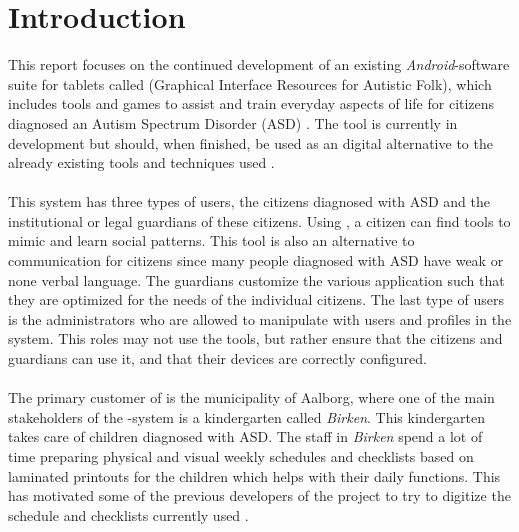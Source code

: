 \chapter{Introduction}
\label{cha:introduction}

This report focuses on the continued development of an existing \emph{Android}-software suite for tablets called \giraf (Graphical Interface Resources for Autistic Folk), which includes tools and games to assist and train everyday aspects of life for citizens diagnosed an Autism Spectrum Disorder (ASD) \parencite{asd}. The tool is currently in development but should, when finished, be used as an digital alternative to the already existing tools and techniques used \parencite{birken_slides}.
\\\\ 
This system has three types of users, the citizens diagnosed with ASD and the institutional or legal guardians of these citizens. Using \giraf, a citizen can find tools to mimic and learn social patterns. This tool is also an alternative to communication for citizens since many people diagnosed with ASD have weak or none verbal language. The guardians customize the various application such that they are optimized for the needs of the individual citizens. The last type of users is the administrators who are allowed to manipulate with users and profiles in the system. This roles may not use the tools, but rather ensure that the citizens and guardians can use it, and that their devices are correctly configured.
\\\\
The primary customer of \giraf is the municipality of Aalborg, where one of the main stakeholders of the \giraf-system is a kindergarten called \emph{Birken}. This kindergarten takes care of children diagnosed with ASD. The staff in \emph{Birken} spend a lot of time preparing physical and visual weekly schedules and checklists based on laminated printouts for the children which helps with their daily functions. This has motivated some of the previous developers of the \giraf project to try to digitize the schedule and checklists currently used \parencite{birken_slides}.



